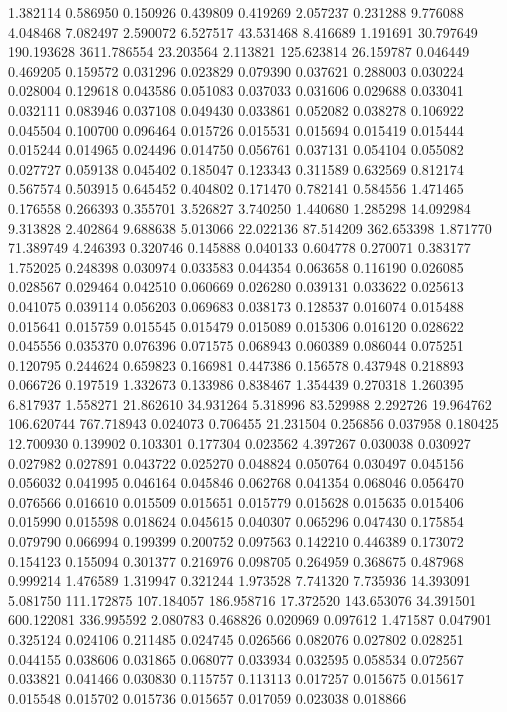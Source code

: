 1.382114
0.586950
0.150926
0.439809
0.419269
2.057237
0.231288
9.776088
4.048468
7.082497
2.590072
6.527517
43.531468
8.416689
1.191691
30.797649
190.193628
3611.786554
23.203564
2.113821
125.623814
26.159787
0.046449
0.469205
0.159572
0.031296
0.023829
0.079390
0.037621
0.288003
0.030224
0.028004
0.129618
0.043586
0.051083
0.037033
0.031606
0.029688
0.033041
0.032111
0.083946
0.037108
0.049430
0.033861
0.052082
0.038278
0.106922
0.045504
0.100700
0.096464
0.015726
0.015531
0.015694
0.015419
0.015444
0.015244
0.014965
0.024496
0.014750
0.056761
0.037131
0.054104
0.055082
0.027727
0.059138
0.045402
0.185047
0.123343
0.311589
0.632569
0.812174
0.567574
0.503915
0.645452
0.404802
0.171470
0.782141
0.584556
1.471465
0.176558
0.266393
0.355701
3.526827
3.740250
1.440680
1.285298
14.092984
9.313828
2.402864
9.688638
5.013066
22.022136
87.514209
362.653398
1.871770
71.389749
4.246393
0.320746
0.145888
0.040133
0.604778
0.270071
0.383177
1.752025
0.248398
0.030974
0.033583
0.044354
0.063658
0.116190
0.026085
0.028567
0.029464
0.042510
0.060669
0.026280
0.039131
0.033622
0.025613
0.041075
0.039114
0.056203
0.069683
0.038173
0.128537
0.016074
0.015488
0.015641
0.015759
0.015545
0.015479
0.015089
0.015306
0.016120
0.028622
0.045556
0.035370
0.076396
0.071575
0.068943
0.060389
0.086044
0.075251
0.120795
0.244624
0.659823
0.166981
0.447386
0.156578
0.437948
0.218893
0.066726
0.197519
1.332673
0.133986
0.838467
1.354439
0.270318
1.260395
6.817937
1.558271
21.862610
34.931264
5.318996
83.529988
2.292726
19.964762
106.620744
767.718943
0.024073
0.706455
21.231504
0.256856
0.037958
0.180425
12.700930
0.139902
0.103301
0.177304
0.023562
4.397267
0.030038
0.030927
0.027982
0.027891
0.043722
0.025270
0.048824
0.050764
0.030497
0.045156
0.056032
0.041995
0.046164
0.045846
0.062768
0.041354
0.068046
0.056470
0.076566
0.016610
0.015509
0.015651
0.015779
0.015628
0.015635
0.015406
0.015990
0.015598
0.018624
0.045615
0.040307
0.065296
0.047430
0.175854
0.079790
0.066994
0.199399
0.200752
0.097563
0.142210
0.446389
0.173072
0.154123
0.155094
0.301377
0.216976
0.098705
0.264959
0.368675
0.487968
0.999214
1.476589
1.319947
0.321244
1.973528
7.741320
7.735936
14.393091
5.081750
111.172875
107.184057
186.958716
17.372520
143.653076
34.391501
600.122081
336.995592
2.080783
0.468826
0.020969
0.097612
1.471587
0.047901
0.325124
0.024106
0.211485
0.024745
0.026566
0.082076
0.027802
0.028251
0.044155
0.038606
0.031865
0.068077
0.033934
0.032595
0.058534
0.072567
0.033821
0.041466
0.030830
0.115757
0.113113
0.017257
0.015675
0.015617
0.015548
0.015702
0.015736
0.015657
0.017059
0.023038
0.018866
